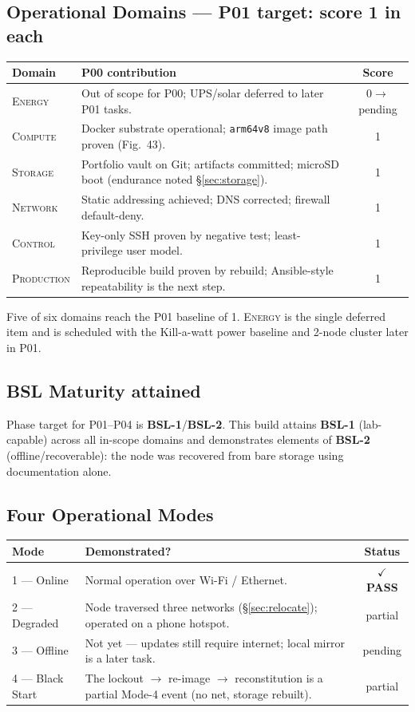 \documentclass[11pt,a4paper]{article}
\newcommand{\pass}{\textcolor{okgreen}{\textbf{$\checkmark$ PASS}}}
\newcommand{\bsl}[1]{\textcolor{dcred}{\textbf{BSL-#1}}}
\newcommand{\domain}[1]{\textsc{#1}}
\begin{document}
\subsection{Operational Domains — P01 target: score 1 in each}
\begin{longtable}{@{}p{2.3cm} p{7.6cm} c@{}}
\toprule
\textbf{Domain} & \textbf{P00 contribution} & \textbf{Score}\\
\midrule\endhead
\domain{Energy}     & Out of scope for P00; UPS/solar deferred to later P01 tasks. & 0$\rightarrow$pending\\
\domain{Compute}    & Docker substrate operational; \texttt{arm64v8} image path proven (Fig.\ 43). & 1\\
\domain{Storage}    & Portfolio vault on Git; artifacts committed; microSD boot (endurance noted §\ref{sec:storage}). & 1\\
\domain{Network}    & Static addressing achieved; DNS corrected; firewall default-deny. & 1\\
\domain{Control}    & Key-only SSH proven by negative test; least-privilege user model. & 1\\
\domain{Production} & Reproducible build proven by rebuild; Ansible-style repeatability is the next step. & 1\\
\bottomrule
\end{longtable}
\noindent Five of six domains reach the P01 baseline of 1. \domain{Energy} is the
single deferred item and is scheduled with the Kill-a-watt power baseline and
2-node cluster later in P01.

\subsection{BSL Maturity attained}
Phase target for P01–P04 is \bsl{1}/\bsl{2}. This build attains \bsl{1}
(lab-capable) across all in-scope domains and demonstrates elements of \bsl{2}
(offline/recoverable): the node was recovered from bare storage using
documentation alone.

\subsection{Four Operational Modes}
\begin{longtable}{@{}p{3.2cm} p{8.4cm} c@{}}
\toprule
\textbf{Mode} & \textbf{Demonstrated?} & \textbf{Status}\\
\midrule\endhead
1 — Online       & Normal operation over Wi-Fi / Ethernet. & \pass\\
2 — Degraded     & Node traversed three networks (§\ref{sec:relocate}); operated on a phone hotspot. & partial\\
3 — Offline      & Not yet — updates still require internet; local mirror is a later task. & pending\\
4 — Black Start  & The lockout $\rightarrow$ re-image $\rightarrow$ reconstitution is a partial Mode-4 event (no net, storage rebuilt). & partial\\
\bottomrule
\end{longtable}
\end{document}
